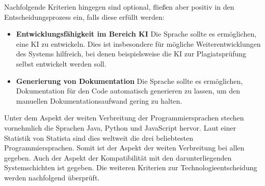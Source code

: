 Nachfolgende Kriterien hingegen sind optional, fließen aber
positiv in den Entscheidungsprozess ein, falls diese erfüllt werden:
\begin{itemize}
    \item \textbf{Entwicklungsfähigkeit im Bereich KI} Die Sprache sollte es ermöglichen, eine KI zu entwickeln.
    Dies ist insbesondere für mögliche Weiterentwicklungen des Systems hilfreich,
    bei denen beispielsweise die KI zur Plagiatsprüfung selbst entwickelt werden soll.
    \item \textbf{Generierung von Dokumentation} Die Sprache sollte es ermöglichen, Dokumentation für den Code
    automatisch generieren zu lassen, um den manuellen Dokumentationsaufwand gering zu halten.
\end{itemize}
Unter dem Aspekt der weiten Verbreitung der Programmiersprachen
stechen vornehmlich die Sprachen Java, Python und JavaScript hervor.
Laut einer Statistik von Statista sind dies weltweit die drei beliebtesten Programmiersprachen\autocite{programmiersprachen}.
Somit ist der Aspekt der weiten Verbreitung bei allen gegeben.
Auch der Aspekt der Kompatibilität mit den darunterliegenden Systemschichten ist gegeben.
Die weiteren Kriterien zur Technologieentscheidung werden nachfolgend überprüft.

